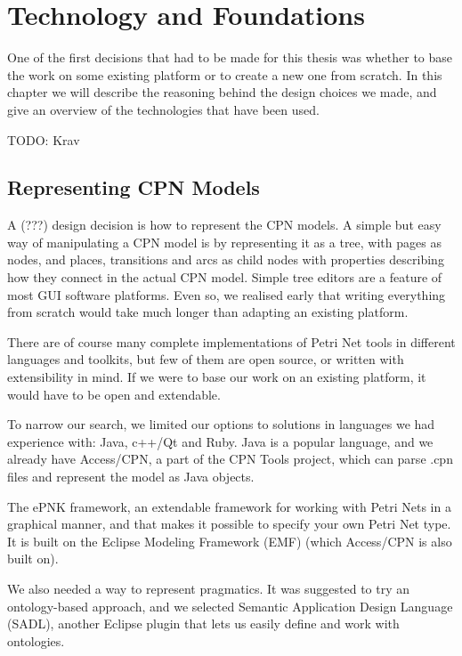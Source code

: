 \chapter{Technology and Foundations}
\label{chap:technology}

One of the first decisions that had to be made for this thesis was whether to
base the work on some existing platform or to create a new one from
scratch. In this chapter we will describe the reasoning behind the
design choices we made, and give an overview of the technologies that have been
used.

TODO: Krav

\section{Representing CPN Models}
	A (???) design decision is how to represent the CPN models. A simple but easy
	way of manipulating a CPN model is by representing it as a tree, with pages as
	nodes, and places, transitions and arcs as child nodes with properties
	describing how they connect in the actual CPN model.
	Simple tree editors are a feature of most GUI software platforms.
	Even so, we realised early that writing everything from scratch would take
	much longer than adapting an existing platform.

	There are of course many complete implementations of Petri Net tools in
	different languages and toolkits, but few of them are open source, or written
	with extensibility in mind. If we were to base our work on an existing
	platform, it would have to be open and extendable. 
	
	To narrow our search, we limited our options to solutions in
	languages we had experience with: Java, c++/Qt and Ruby. Java is a popular
	language, and we already have Access/CPN, a part of the CPN Tools project,
	which can parse .cpn files and represent the model as Java objects. 
	
	The ePNK framework, an extendable framework for working with Petri Nets in a
	graphical manner, and that makes it possible to specify your own Petri Net
	type. It is built on the Eclipse Modeling Framework (EMF) (which Access/CPN is
	also built on).
	
	We also needed a way to represent pragmatics. It was suggested to try an
	ontology-based approach, and we selected Semantic Application Design Language
	(SADL), another Eclipse plugin that lets us easily define and work with ontologies.
	
	
